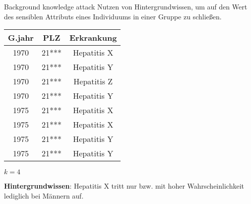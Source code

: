 \begin{frame} {Background knowledge attack}
	Nutzen von Hintergrundwissen, um auf den Wert des sensiblen Attributs eines Individuums in einer Gruppe zu schließen.
	\vspace{0.5cm}

	\centering
	\small
	\begin{tabular}{|c|c|c|}
	\hline \textbf{G.jahr} & \textbf{PLZ} & \textbf{Erkrankung} \\
	\hline 1970 & 21*** & Hepatitis X \\ 
	 1970 & 21*** & Hepatitis Y \\ 
	 1970 & 21*** & Hepatitis Z \\ 
	 1970 & 21*** & Hepatitis Y \\ 
	\hline 1975 & 21*** & \cellcolor{svshellblau1}Hepatitis X \\ 
	 1975 & 21*** & \cellcolor{svshellblau1} Hepatitis X \\ 
	 1975 & 21*** & \cellcolor{svsrot}Hepatitis Y \\ 
	 1975 & 21*** & \cellcolor{svsrot}Hepatitis Y \\
	\hline 
	\end{tabular}
	\vspace{0.3cm}
	
	\centering
	\(k = 4\)
	\vspace{0.3cm}

	\textbf{Hintergrundwissen}: Hepatitis X tritt nur bzw. mit hoher Wahrscheinlichkeit lediglich bei Männern auf.
\end{frame}
